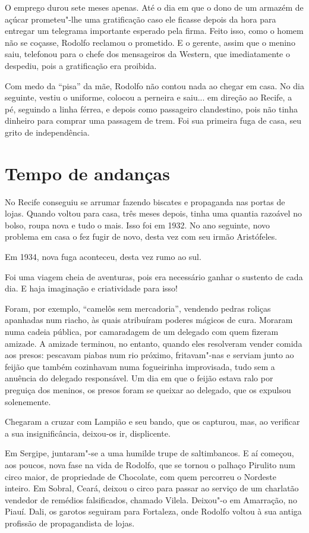 O emprego durou sete meses apenas. Até o dia em que o dono de um
armazém de açúcar prometeu"-lhe uma gratificação caso ele ficasse
depois da hora para entregar um telegrama importante esperado pela
firma. Feito isso, como o homem não se coçasse, Rodolfo reclamou o
prometido. E o gerente, assim que o menino saiu, telefonou para o chefe
dos mensageiros da Western, que imediatamente o despediu, pois a
gratificação era proibida.

Com medo da ``pisa'' da mãe, Rodolfo não
contou nada ao chegar em casa. No dia seguinte, vestiu o uniforme,
colocou a perneira e saiu... em direção ao Recife, a pé, seguindo a
linha férrea, e depois como passageiro clandestino, pois não tinha
dinheiro para comprar uma passagem de trem. Foi sua primeira fuga de
casa, seu grito de independência.

\section{Tempo de andanças}


No Recife conseguiu se arrumar fazendo biscates e propaganda nas portas
de lojas. Quando voltou para casa, três meses depois, tinha uma quantia
razoável no bolso, roupa nova e tudo o mais. Isso foi em 1932. No ano
seguinte, novo problema em casa o fez fugir de novo, desta vez com seu
irmão Aristófeles.

Em 1934, nova fuga aconteceu, desta vez rumo ao sul.

Foi uma viagem cheia de aventuras, pois era necessário ganhar o
sustento de cada dia. E haja imaginação e criatividade para isso!

Foram, por exemplo, ``camelôs sem
mercadoria'', vendendo pedras roliças apanhadas num
riacho, às quais atribuíram poderes mágicos de cura. Moraram numa
cadeia pública, por camaradagem de um delegado com quem fizeram
amizade. A amizade terminou, no entanto, quando eles resolveram vender
comida aos presos: pescavam piabas num rio próximo, fritavam"-nas e
serviam junto ao feijão que também cozinhavam numa fogueirinha
improvisada, tudo sem a anuência do delegado responsável. Um dia em que
o feijão estava ralo por preguiça dos meninos, os presos foram se
queixar ao delegado, que os expulsou solenemente.

Chegaram a cruzar com Lampião e seu bando, que os capturou, mas, ao
verificar a sua insignificância, deixou-os ir, displicente.

Em Sergipe, juntaram"-se a uma humilde trupe de saltimbancos. E aí
começou, aos poucos, nova fase na vida de Rodolfo, que se tornou o
palhaço Pirulito num circo maior, de propriedade de Chocolate, com quem
percorreu o Nordeste inteiro. Em Sobral, Ceará, deixou o circo para
passar ao serviço de um charlatão vendedor de remédios falsificados,
chamado Vilela. Deixou"-o em Amarração, no Piauí. Dali, os garotos
seguiram para Fortaleza, onde Rodolfo voltou à sua antiga profissão de
propagandista de lojas.

